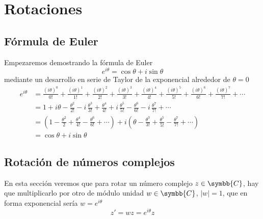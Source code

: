 %


\chapter{Rotaciones}

\section{Fórmula de Euler}\label{sect:rot-taylor}
Empezaremos demostrando la fórmula de Euler
\begin{equation}\label{eq:rot-Euler}
  e^{i\theta} = \cos\theta + i \sin\theta
\end{equation}
mediante un desarrollo en serie de Taylor de la exponencial alrededor de
$\theta=0$
\begin{align*} 
  e^{i\theta}
  &=
    \frac{(i\theta)^0}{0!}
    + \frac{(i\theta)^1}{1!}
    + \frac{(i\theta)^2}{2!}
    + \frac{(i\theta)^3}{3!}
    + \frac{(i\theta)^4}{4!}
    + \frac{(i\theta)^5}{5!}
    + \frac{(i\theta)^6}{6!}
    + \frac{(i\theta)^7}{7!}
    + \cdots\\
  &=
    1
    + i\theta
    - \frac{\theta^2}{2!}
    - i\,\frac{\theta^3}{3!}
    + \frac{\theta^4}{4!}
    + i\,\frac{\theta^5}{5!}
    - \frac{\theta^6}{6!}
    - i\,\frac{\theta^7}{7!}
    + \cdots\\
  &=
    \left(
    1 - \frac{\theta^2}{2} + \frac{\theta^4}{4!} - \frac{\theta^6}{6!}
    + \cdots
    \right)
    + i\left(
    \theta - \frac{\theta^3}{3!} + \frac{\theta^5}{5!} - \frac{\theta^7}{7!}
    + \cdots
    \right)\\
  &=
    \cos\theta + i \sin\theta
\end{align*}

\section{Rotación de números complejos}
En esta sección veremos que para rotar un número complejo $z\in\symbb{C}$,
hay que multiplicarlo por otro de módulo unidad
$w\in\symbb{C}$, $|w|=1$, que en forma exponencial sería
$w=e^{i\theta}$
\begin{equation}\label{eq:rot-rotacion-complejo}
  z' = w z = e^{i\theta} z
\end{equation}

